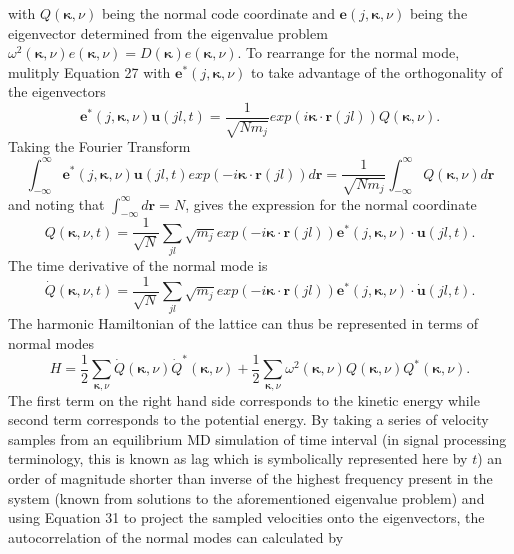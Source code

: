 \documentclass[aps,prb,preprint,preprintnumbers,amsmath,amssymb,floatfix,superscriptaddress]{revtex4}
\begin{document}
with $Q(\pmb{\kappa},\nu)$ being the normal code coordinate and $\pmb{e}(j,\pmb{\kappa},\nu)$ being the eigenvector determined from the eigenvalue problem $\omega^2(\pmb{\kappa},\nu) e(\pmb{\kappa},\nu)=D(\pmb{\kappa})e(\pmb{\kappa},\nu)$. To rearrange for the normal mode, mulitply Equation 27 with $\pmb{e}^*(j,\pmb{\kappa},\nu)$ to take advantage of the orthogonality of the eigenvectors
\begin{equation}
\pmb{e}^*(j,\pmb{\kappa},\nu)\pmb{u}(jl,t)=\frac{1}{\sqrt{Nm_j}}exp(i\pmb{\kappa}\cdot\pmb{r}(jl))Q(\pmb{\kappa},\nu).
\end{equation}
Taking the Fourier Transform
\begin{equation}
\int_{-\infty}^{\infty}\pmb{e}^*(j,\pmb{\kappa},\nu)\pmb{u}(jl,t)exp(-i\pmb{\kappa}\cdot\pmb{r}(jl))d\pmb{r}=\frac{1}{\sqrt{Nm_j}}\int_{-\infty}^{\infty}Q(\pmb{\kappa},\nu)d\pmb{r}
\end{equation}
and noting that $\int_{-\infty}^{\infty}d\pmb{r}=N$, gives the expression for the normal coordinate
\begin{equation}
Q(\pmb{\kappa},\nu,t)=\frac{1}{\sqrt{N}}\sum_{jl}\sqrt{m_j}exp(-i\pmb{\kappa}\cdot\pmb{r}(jl))\pmb{e}^*(j,\pmb{\kappa},\nu)\cdot\pmb{u}(jl,t).
\end{equation}
The time derivative of the normal mode is
\begin{equation}
\dot{Q}(\pmb{\kappa},\nu,t)=\frac{1}{\sqrt{N}}\sum_{jl}\sqrt{m_j}exp(-i\pmb{\kappa}\cdot\pmb{r}(jl))\pmb{e}^*(j,\pmb{\kappa},\nu)\cdot\dot{\pmb{u}}(jl,t).
\end{equation}
The harmonic Hamiltonian of the lattice can thus be represented in terms of normal modes
\begin{equation}
H=\frac{1}{2}\sum_{\pmb{\kappa},\nu}\dot{Q}(\pmb{\kappa},\nu)\dot{Q}^*(\pmb{\kappa},\nu)+\frac{1}{2}\sum_{\pmb{\kappa},\nu}\omega^2(\pmb{\kappa},\nu)Q(\pmb{\kappa},\nu)Q^*(\pmb{\kappa},\nu).
\end{equation}
The first term on the right hand side corresponds to the kinetic energy while second term corresponds to the potential energy. By taking a series of velocity samples from an equilibrium MD simulation of time interval (in signal processing terminology, this is known as lag which is symbolically represented here by $t$) an order of magnitude shorter than inverse of the highest frequency present in the system (known from solutions to the aforementioned eigenvalue problem) and using Equation 31 to project the sampled velocities onto the eigenvectors, the autocorrelation of the normal modes can calculated by
\end{document}
